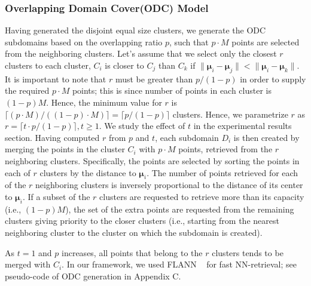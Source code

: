 \vspace{-1.5mm}
\subsubsection{Overlapping Domain Cover(ODC) Model}
\label{sec:train1}

 Having generated the disjoint equal size clusters, we generate the ODC subdomains based on the overlapping ratio $p$, such that $p \cdot M$ points are selected from the neighboring clusters. Let's assume that we select only the closest $r$  clusters to each cluster,  $C_i$ is closer to $C_j$ than $C_k$ if $\| \boldsymbol{\mu}_i - \boldsymbol{\mu}_j\| < \| \boldsymbol{\mu}_i - \boldsymbol{\mu}_k\|$. It is important to note that $r$ must be greater than  $p/(1-p)$ in order to supply the required $p \cdot M$ points; this is since number of points in each cluster is $(1-p) M$. Hence, the minimum value for $r$ is $\lceil(p \cdot M)/ ( (1-p)  \cdot M)\rceil = \lceil p/(1-p) \rceil$ clusters. Hence, we parametrize $r$ as $r =  \lceil t \cdot p/(1-p) \rceil, t\ge 1$. We study the effect of $t$ in the experimental results section. Having computed $r$ from $p$ and $t$, each subdomain $D_i$ is then created by merging the points in the cluster $C_i$ with $p \cdot M$ points, retrieved from the $r$ neighboring clusters. Specifically, the points are selected by sorting the points in each of $r$ clusters by the distance to $\boldsymbol{\mu}_i$. The number of points retrieved for each of the $r$ neighboring clusters is inversely proportional to the distance of its center to $\boldsymbol{\mu}_i$. If a subset of the $r$ clusters are requested to retrieve more than its capacity (i.e., $(1-p) M$), the set of the extra points are requested from the remaining clusters giving priority to the closer clusters (i.e., starting from the nearest neighboring cluster to the cluster on which the subdomain is created). As $t=1$ and $p$ increases, all points that belong to the $r$ clusters tends to be merged with $C_i$. In our framework, we used FLANN ~\cite{flann09} for fast NN-retrieval; see pseudo-code of ODC generation in  Appendix C.
 
